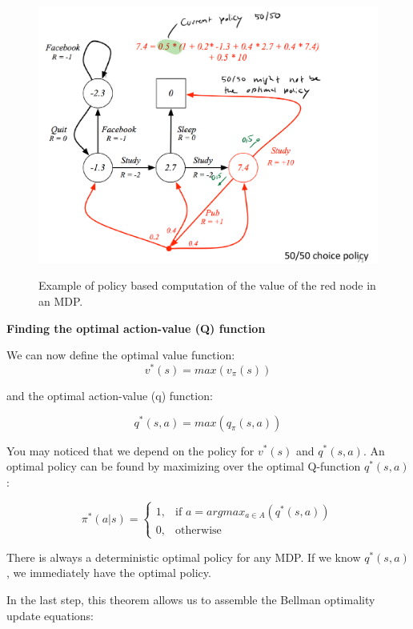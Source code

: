 \documentclass[main]{subfiles}
\begin{document}
\begin{figure}[H]
	\centering
	\includegraphics[width=0.9\linewidth]{08_ReinforcementLearning/figures/bellmann-mdp.png}
	\label{fig:mrp-example}
	\caption{Example of policy based computation of the value of the red node in an MDP.}
\end{figure}

\textbf{Finding the optimal action-value (Q) function}

We can now define the optimal value function:
\begin{equation}
    v^*(s) = max (v_\pi(s))
\end{equation}

and the optimal action-value (q) function:

\begin{equation}
    q^*(s,a) = max (q_\pi(s,a))
\end{equation}

You may noticed that we depend on the policy for  $v^*(s)$ and $q^*(s,a)$.
An optimal policy can be found by maximizing over the optimal Q-function $q^*(s,a)$:

\begin{equation*}
\pi^*(a|s) =     
\begin{cases}
    1, & \text{if } a = argmax_{a \in A}(q^*(s,a)) \\
    0, & \text{otherwise}
\end{cases}
\end{equation*}


There is always a deterministic optimal policy for any MDP.
If we know $q^*(s,a)$, we immediately have the optimal policy.

In the last step, this theorem allows us to assemble the Bellman optimality update equations:
\end{document}
